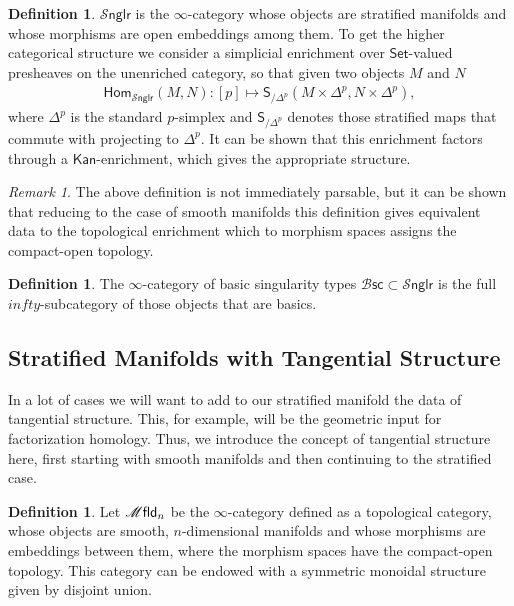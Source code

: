 \documentclass[12pt,a4paper]{article}
\newcounter{counter} \numberwithin{counter}{section}
\theoremstyle{definition}
\newtheorem{definition}[counter]{Definition}
\theoremstyle{plain}
\theoremstyle{remark}
\newtheorem{remark}[counter]{Remark}
\newcommand{\mfld}[1][s]{%
    \ifx r#1\mathsf{Mfld}\else
    \ifx s#1\mathscr{M} \mathsf{fld}\else
    \mathrm{Illegal~option}%
    \fi\fi
}
\newcommand{\bsc}{\mathscr{B} \mathsf{sc}}
\newcommand{\snglr}{\mathscr{S} \mathsf{nglr}}
\begin{document}
\begin{definition}
    $\snglr$ is the $\infty$-category whose objects are stratified manifolds and whose morphisms are open embeddings among them. To get the higher categorical structure we consider a simplicial enrichment over $\mathsf{Set}$-valued presheaves on the unenriched category, so that given two objects $M$ and $N$
    \begin{align}
        \mathsf{Hom}_{\snglr} (M, N): [p] \mapsto \mathsf{S}_{/\Delta^p} (M \times \Delta^p, N \times \Delta^p),
    \end{align}
    where $\Delta^p$ is the standard $p$-simplex and $\mathsf{S}_{/\Delta^p}$ denotes those stratified maps that commute with projecting to $\Delta^p$. It can be shown that this enrichment factors through a $\mathsf{Kan}$-enrichment, which gives the appropriate structure.
\end{definition}

\begin{remark}
    The above definition is not immediately parsable, but it can be shown that reducing to the case of smooth manifolds this definition gives equivalent data to the topological enrichment which to morphism spaces assigns the compact-open topology. 
\end{remark}

\begin{definition}
    The $\infty$-category of basic singularity types $\bsc \subset \snglr$ is the full $infty$-subcategory of those objects that are basics.
\end{definition}




\subsection{Stratified Manifolds with Tangential Structure}

In a lot of cases we will want to add to our stratified manifold the data of tangential structure. This, for example, will be the geometric input for factorization homology. Thus, we introduce the concept of tangential structure here, first starting with smooth manifolds and then continuing to the stratified case.

\begin{definition}
    Let $\mfld_n$ be the $\infty$-category defined as a topological category, whose objects are smooth, $n$-dimensional manifolds and whose morphisms are embeddings between them, where the morphism spaces have the compact-open topology. This category can be endowed with a symmetric monoidal structure given by disjoint union.
\end{definition}
\end{document}
